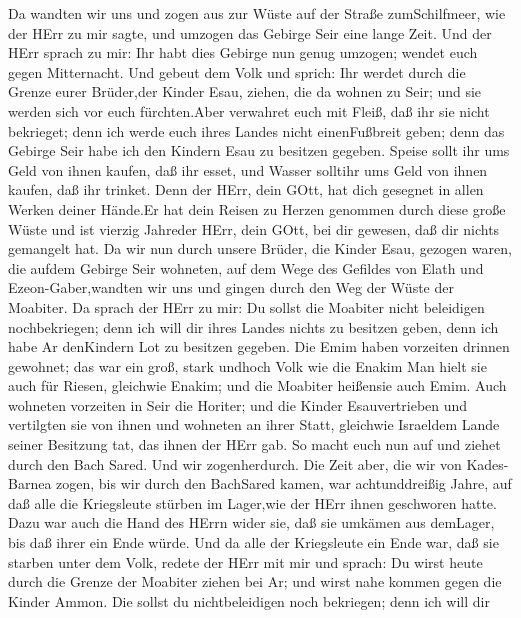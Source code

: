  Da wandten wir uns und zogen aus zur Wüste auf der Straße
zumSchilfmeer, wie der HErr zu mir sagte, und umzogen das Gebirge Seir
eine lange Zeit.  Und der HErr sprach zu mir: 
Ihr habt dies Gebirge nun genug umzogen; wendet euch gegen Mitternacht.
 Und gebeut dem Volk und sprich: Ihr werdet durch die Grenze
eurer Brüder,der Kinder Esau, ziehen, die da wohnen zu Seir; und sie
werden sich vor euch fürchten.Aber verwahret euch mit Fleiß,
 daß ihr sie nicht bekrieget; denn ich werde euch ihres
Landes nicht einenFußbreit geben; denn das Gebirge Seir habe ich den
Kindern Esau zu besitzen gegeben.  Speise sollt ihr ums Geld
von ihnen kaufen, daß ihr esset, und Wasser solltihr ums Geld von ihnen
kaufen, daß ihr trinket.  Denn der HErr, dein GOtt, hat dich
gesegnet in allen Werken deiner Hände.Er hat dein Reisen zu Herzen
genommen durch diese große Wüste und ist vierzig Jahreder HErr, dein
GOtt, bei dir gewesen, daß dir nichts gemangelt hat.  Da wir
nun durch unsere Brüder, die Kinder Esau, gezogen waren, die aufdem
Gebirge Seir wohneten, auf dem Wege des Gefildes von Elath und
Ezeon-Gaber,wandten wir uns und gingen durch den Weg der Wüste der
Moabiter.  Da sprach der HErr zu mir: Du sollst die Moabiter
nicht beleidigen nochbekriegen; denn ich will dir ihres Landes nichts zu
besitzen geben, denn ich habe Ar denKindern Lot zu besitzen gegeben.
 Die Emim haben vorzeiten drinnen gewohnet; das war ein
groß, stark undhoch Volk wie die Enakim  Man hielt sie auch
für Riesen, gleichwie Enakim; und die Moabiter heißensie auch Emim.
 Auch wohneten vorzeiten in Seir die Horiter; und die
Kinder Esauvertrieben und vertilgten sie von ihnen und wohneten an ihrer
Statt, gleichwie Israeldem Lande seiner Besitzung tat, das ihnen der
HErr gab.  So macht euch nun auf und ziehet durch den Bach
Sared. Und wir zogenherdurch.  Die Zeit aber, die wir von
Kades-Barnea zogen, bis wir durch den BachSared kamen, war
achtunddreißig Jahre, auf daß alle die Kriegsleute stürben im Lager,wie
der HErr ihnen geschworen hatte.  Dazu war auch die Hand
des HErrn wider sie, daß sie umkämen aus demLager, bis daß ihrer ein
Ende würde.  Und da alle der Kriegsleute ein Ende war, daß
sie starben unter dem Volk,  redete der HErr mit mir und
sprach:  Du wirst heute durch die Grenze der Moabiter
ziehen bei Ar;  und wirst nahe kommen gegen die Kinder
Ammon. Die sollst du nichtbeleidigen noch bekriegen; denn ich will dir
